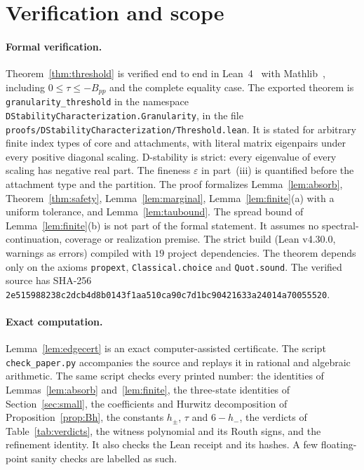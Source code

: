 \documentclass[11pt,a4paper]{article}
\theoremstyle{plain}
\theoremstyle{definition}
\theoremstyle{remark}
\begin{document}
\section{Verification and scope}\label{sec:verification}

\paragraph{Formal verification.}
Theorem~\ref{thm:threshold} is verified end to end in Lean~4~\cite{demoura2021}
with Mathlib~\cite{mathlib2020}, including $0\le\tau\le-B_{pp}$ and the complete
equality case. The exported theorem is \texttt{granularity\_threshold} in the
namespace \texttt{DStabilityCharacterization.Granularity}, in the file
\texttt{proofs/DStabilityCharacterization/Threshold.lean}. It is stated for
arbitrary finite index types of core and attachments, with literal
matrix eigenpairs under every positive diagonal scaling. D-stability is
strict: every eigenvalue of every scaling has negative real part. The
fineness $\varepsilon$ in part~(iii) is quantified before the attachment type
and the partition. The proof formalizes Lemma~\ref{lem:absorb},
Theorem~\ref{thm:safety}, Lemma~\ref{lem:marginal}, Lemma~\ref{lem:finite}(a)
with a uniform tolerance, and Lemma~\ref{lem:taubound}. The spread bound of
Lemma~\ref{lem:finite}(b) is not part of the formal statement. It assumes no spectral-continuation, coverage or
realization premise. The strict build (Lean v4.30.0, warnings as errors)
compiled with $19$ project dependencies. The theorem depends only on the
axioms \texttt{propext}, \texttt{Classical.choice} and \texttt{Quot.sound}. The
verified source has SHA-256
\texttt{2e515988238c2dcb4d8b0143f1aa510ca90c7d1bc90421633a24014a70055520}.

\paragraph{Exact computation.}
Lemma~\ref{lem:edgecert} is an exact computer-assisted certificate. The
script \texttt{check\_paper.py} accompanies the source and replays it in
rational and algebraic arithmetic. The same script checks every printed number:
the identities of Lemmas~\ref{lem:absorb} and~\ref{lem:finite}, the
three-state identities of Section~\ref{sec:small}, the coefficients and
Hurwitz decomposition of Proposition~\ref{prop:Bh}, the constants $h_\pm$,
$\tau$ and $6-h_-$, the verdicts of Table~\ref{tab:verdicts}, the witness
polynomial and its Routh signs, and the refinement identity. It also checks
the Lean receipt and its hashes. A few floating-point sanity checks are
labelled as such.
\end{document}

